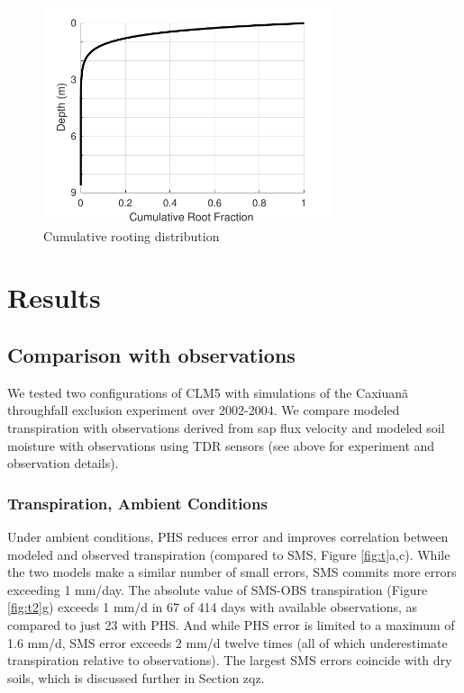 \documentclass[draft,linenumbers]{agujournal}
\begin{document}
  \begin{figure}[h]
     \centering
     \includegraphics[width=20pc]{../figs3/roots.pdf}
     \caption{Cumulative rooting distribution}
     \label{roots}
  \end{figure}

\section{Results}  

\subsection{Comparison with observations}
\label{sect:obs}

We tested two configurations of CLM5 with simulations of the Caxiuan\~a throughfall exclusion experiment over 2002-2004. We compare modeled transpiration with observations derived from sap flux velocity and modeled soil moisture with observations using TDR sensors (see above for experiment and observation details).

\subsubsection{Transpiration, Ambient Conditions}
Under ambient conditions, PHS reduces error and improves correlation between modeled and observed transpiration (compared to SMS, Figure \ref{fig:t}a,c).
While the two models make a similar number of small errors, SMS commits more errors exceeding 1 mm/day.
The absolute value of SMS-OBS transpiration (Figure \ref{fig:t2}g) exceeds 1 mm/d in 67 of 414 days with available observations, as compared to just 23 with PHS.
And while PHS error is limited to a maximum of 1.6 mm/d, SMS error exceeds 2 mm/d twelve times (all of which underestimate transpiration relative to observations).
The largest SMS errors coincide with dry soils, which is discussed further in Section zqz. 
\end{document}
